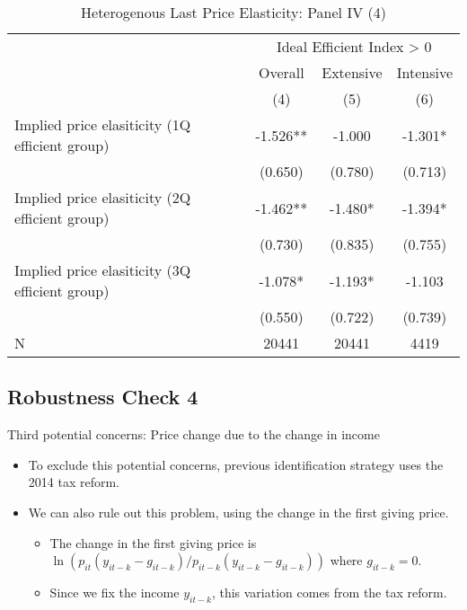 \documentclass[ review  , 3p ]{elsarticle}
\providecommand{\tightlist}{%
  \setlength{\itemsep}{0pt}\setlength{\parskip}{0pt}}
\begin{document}
  \begin{table}

  \caption{\label{tab:kableHeteroShortElasticitySlide4}Heterogenous Last Price Elasticity: Panel IV (4)}
  \centering
  \fontsize{8}{10}\selectfont
  \begin{tabular}[t]{lccc}
  \toprule
  \multicolumn{1}{c}{ } & \multicolumn{3}{c}{Ideal Efficient Index > 0} \\
  \cmidrule(l{3pt}r{3pt}){2-4}
  \multicolumn{1}{c}{ } & \multicolumn{1}{c}{Overall} & \multicolumn{1}{c}{Extensive} & \multicolumn{1}{c}{Intensive} \\
  \cmidrule(l{3pt}r{3pt}){2-2} \cmidrule(l{3pt}r{3pt}){3-3} \cmidrule(l{3pt}r{3pt}){4-4}
   & (4) & (5) & (6)\\
  \midrule
  Implied price elasiticity (1Q efficient group) & -1.526** & -1.000 & -1.301*\\
   & (0.650) & (0.780) & (0.713)\\
  Implied price elasiticity (2Q efficient group) & -1.462** & -1.480* & -1.394*\\
   & (0.730) & (0.835) & (0.755)\\
  Implied price elasiticity (3Q efficient group) & -1.078* & -1.193* & -1.103\\
   & (0.550) & (0.722) & (0.739)\\
  N & 20441 & 20441 & 4419\\
  \bottomrule
  \end{tabular}
  \end{table}

  \hypertarget{robustness-check-4}{%
  \subsection{Robustness Check 4}\label{robustness-check-4}}

  Third potential concerns: Price change due to the change in income

  \begin{itemize}
  \tightlist
  \item
    To exclude this potential concerns, previous identification strategy uses the 2014 tax reform.
  \item
    We can also rule out this problem, using the change in the first giving price.

    \begin{itemize}
    \tightlist
    \item
      The change in the first giving price is \(\ln(p_{it}(y_{it-k} - g_{it-k})/p_{it-k}(y_{it-k} - g_{it-k}))\) where \(g_{it-k} = 0\).
    \item
      Since we fix the income \(y_{it-k}\), this variation comes from the tax reform.
    \end{itemize}
  \end{itemize}
\end{document}
